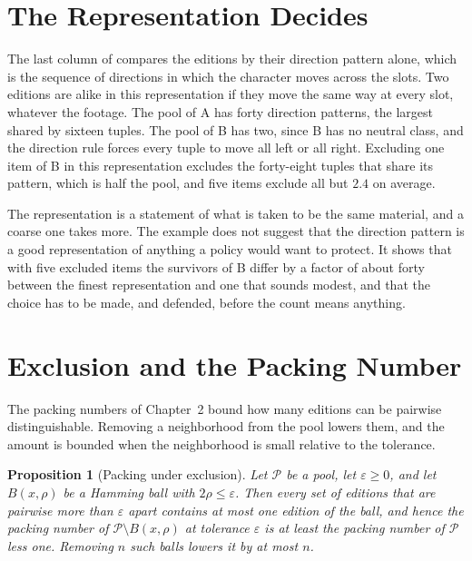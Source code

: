 \documentclass[11pt,twoside,openright]{book}
\theoremstyle{plain}
\newtheorem{proposition}[theorem]{Proposition}
\theoremstyle{definition}
\theoremstyle{remark}
\begin{document}
\section{The Representation Decides}\label{sec:repr15}

The last column of  compares the editions by their direction pattern alone, which is the sequence of directions in which the character moves across the slots. Two editions are alike in this representation if they move the same way at every slot, whatever the footage. The pool of A has forty direction patterns, the largest shared by sixteen tuples. The pool of B has two, since B has no neutral class, and the direction rule forces every tuple to move all left or all right. Excluding one item of B in this representation excludes the forty-eight tuples that share its pattern, which is half the pool, and five items exclude all but $2.4$ on average.

The representation is a statement of what is taken to be the same material, and a coarse one takes more. The example does not suggest that the direction pattern is a good representation of anything a policy would want to protect. It shows that with five excluded items the survivors of B differ by a factor of about forty between the finest representation and one that sounds modest, and that the choice has to be made, and defended, before the count means anything.

\section{Exclusion and the Packing Number}\label{sec:pack15}

The packing numbers of Chapter~2 bound how many editions can be pairwise distinguishable. Removing a neighborhood from the pool lowers them, and the amount is bounded when the neighborhood is small relative to the tolerance.

\begin{proposition}[Packing under exclusion]\label{prop:packexcl}
Let $\mathcal P$ be a pool, let $\varepsilon\ge0$, and let $B(x,\rho)$ be a Hamming ball with $2\rho\le\varepsilon$. Then every set of editions that are pairwise more than $\varepsilon$ apart contains at most one edition of the ball, and hence the packing number of $\mathcal P\setminus B(x,\rho)$ at tolerance $\varepsilon$ is at least the packing number of $\mathcal P$ less one. Removing $n$ such balls lowers it by at most $n$.
\end{proposition}
\end{document}
